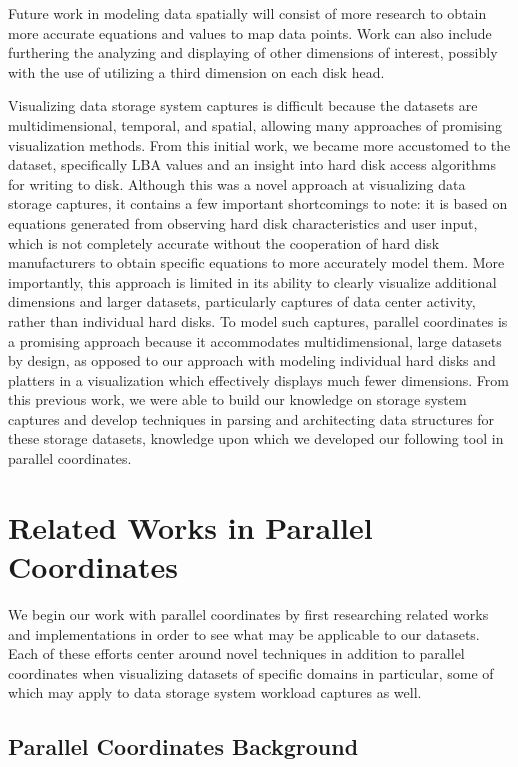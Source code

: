 \documentclass[12pt]{ucthesis}
\begin{document}
Future work in modeling data spatially will consist of more research to obtain more accurate equations and values to map data points. Work can also include furthering the analyzing and displaying of other dimensions of interest, possibly with the use of utilizing a third dimension on each disk head. 

Visualizing data storage system captures is difficult because the datasets are multidimensional, temporal, and spatial, allowing many approaches of promising visualization methods. From this initial work, we became more accustomed to the dataset, specifically LBA values and an insight into hard disk access algorithms for writing to disk. Although this was a novel approach at visualizing data storage captures, it contains a few important shortcomings to note: it is based on equations generated from observing hard disk characteristics and user input, which is not completely accurate without the cooperation of hard disk manufacturers to obtain specific equations to more accurately model them. More importantly, this approach is limited in its ability to clearly visualize additional dimensions and larger datasets, particularly captures of data center activity, rather than individual hard disks. To model such captures, parallel coordinates is a promising approach because it accommodates multidimensional, large datasets by design, as opposed to our approach with modeling individual hard disks and platters in a visualization which effectively displays much fewer dimensions. From this previous work, we were able to build our knowledge on storage system captures and develop techniques in parsing and architecting data structures for these storage datasets, knowledge upon which we developed our following tool in parallel coordinates.

\chapter{Related Works in Parallel Coordinates}
\label{related-works}

We begin our work with parallel coordinates by first researching related works and implementations in order to see what may be applicable to our datasets. Each of these efforts center around novel techniques in addition to parallel coordinates when visualizing datasets of specific domains in particular, some of which may apply to data storage system workload captures as well.

\section{Parallel Coordinates Background}
\label{background}
\end{document}
